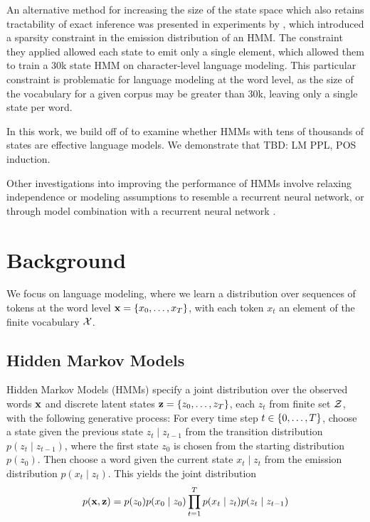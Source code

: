 \documentclass[11pt,a4paper]{article}
\begin{document}
An alternative method for increasing the size of the state space which
also retains tractability of exact inference was presented in
experiments by \citet{dedieu2019learning},
which introduced a sparsity constraint in the emission distribution of an HMM.
The constraint they applied allowed each state to emit only a single element,
which allowed them to train a 30k state HMM on character-level language modeling.
This particular constraint is problematic for language modeling at the word level,
as the size of the vocabulary for a given corpus may be greater than 30k,
leaving only a single state per word.

In this work, we build off of \citet{dedieu2019learning} 
to examine whether HMMs with tens of thousands of states
are effective language models.
We demonstrate that {\color{red}TBD: LM PPL, POS induction}.

Other investigations into improving the performance of HMMs
involve relaxing independence or modeling assumptions \citep{buys2018hmm}
to resemble a recurrent neural network, or through model combination
with a recurrent neural network \citep{krakovna2016hmm}.


\section{Background}
We focus on language modeling,
where we learn a distribution over sequences of tokens
at the word level $\mathbf{x} = \left\{x_0, \ldots, x_T\right\}$, with each token $x_t$
an element of the finite vocabulary $\mathcal{X}$.

\subsection{Hidden Markov Models}
Hidden Markov Models (HMMs) specify a joint distribution over 
the observed words $\mathbf{x}$ and discrete latent states $\mathbf{z} = \left\{z_0, \ldots, z_T\right\}$,
each $z_t$ from finite set $\mathcal{Z}$,
with the following generative process:
For every time step $t \in \left\{0,\ldots,T\right\}$, choose a state given the previous state
$z_t \mid z_{t-1}$ from the transition distribution $p(z_t \mid z_{t-1})$,
where the first state $z_0$ is chosen from the starting distribution $p(z_0)$.
Then choose a word given the current state $x_t \mid z_t$ from the emission distribution $p(x_t \mid z_t)$.
This yields the joint distribution
\begin{equation}
p(\mathbf{x}, \mathbf{z})
= p(z_0)p(x_0 \mid z_0)\prod_{t=1}^T p(x_t\mid z_t)p(z_t \mid z_{t-1})
\end{equation}
\end{document}
